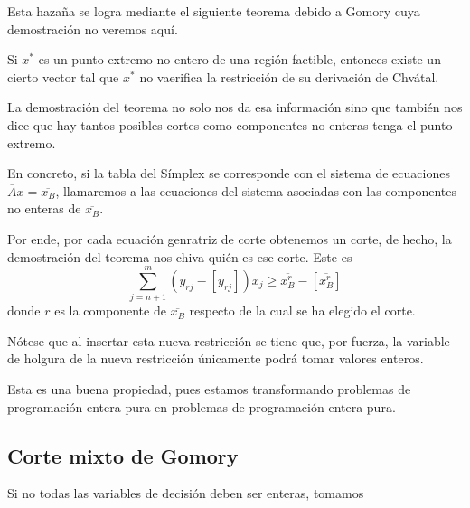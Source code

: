 Esta hazaña se logra mediante el siguiente teorema debido a Gomory cuya demostración no veremos aquí.
\begin{theo}[Gomory]
	Si $x^*$ es un punto extremo no entero de una región factible, entonces existe un cierto vector tal que $x^*$ no vaerifica la restricción de su derivación de Chvátal. 
\end{theo}
La demostración del teorema no solo nos da esa información sino que también nos dice que hay tantos posibles cortes como componentes no enteras tenga el punto extremo.

En concreto, si la tabla del Símplex se corresponde con el sistema de ecuaciones $\overline{A}x=\overline{x_B}$, llamaremos  a las ecuaciones del sistema asociadas con las componentes no enteras de $\overline{x_B}$.

Por ende, por cada ecuación genratriz de corte obtenemos un corte, de hecho, la demostración del teorema nos chiva quién es ese corte. Este es
\begin{equation*}
	\sum_{j=n+1}^{m}(y_{rj}-[y_{rj}])x_j\geq \overline{x_B^r}-[\overline{x_B^r}]
\end{equation*}
donde $r$ es la componente de $\overline{x_B}$ respecto de la cual se ha elegido el corte.
\begin{obs}
	Nótese que al insertar esta nueva restricción se tiene que, por fuerza, la variable de holgura de la nueva restricción únicamente podrá tomar valores enteros.
	
	Esta es una buena propiedad, pues estamos transformando problemas de programación entera pura en problemas de programación entera pura.
\end{obs}
\subsection{Corte mixto de Gomory}
Si no todas las variables de decisión deben ser enteras, tomamos 